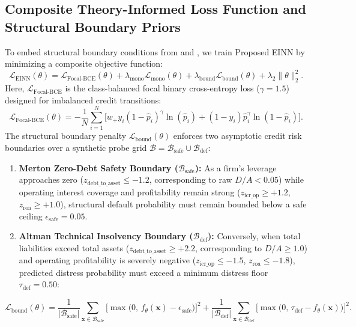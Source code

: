 \documentclass[11pt,a4paper]{article}
\begin{document}
\subsection{Composite Theory-Informed Loss Function and Structural Boundary Priors}
To embed structural boundary conditions from \citet{merton1974pricing} and \citet{altman1995emerging}, we train Proposed EINN by minimizing a composite objective function:
\begin{equation}
    \mathcal{L}_{\text{EINN}}(\theta) = \mathcal{L}_{\text{Focal-BCE}}(\theta) + \lambda_{\text{mono}} \mathcal{L}_{\text{mono}}(\theta) + \lambda_{\text{bound}} \mathcal{L}_{\text{bound}}(\theta) + \lambda_2 \|\theta\|_2^2.
    \label{eq:total_loss}
\end{equation}
Here, $\mathcal{L}_{\text{Focal-BCE}}$ is the class-balanced focal binary cross-entropy loss ($\gamma = 1.5$) designed for imbalanced credit transitions:
\begin{equation}
    \mathcal{L}_{\text{Focal-BCE}}(\theta) = -\frac{1}{N}\sum_{i=1}^N \Big[ w_+ y_i (1 - \hat{p}_i)^\gamma \ln(\hat{p}_i) + (1 - y_i)\hat{p}_i^\gamma \ln(1 - \hat{p}_i) \Big].
\end{equation}
The structural boundary penalty $\mathcal{L}_{\text{bound}}(\theta)$ enforces two asymptotic credit risk boundaries over a synthetic probe grid $\mathcal{B} = \mathcal{B}_{\text{safe}} \cup \mathcal{B}_{\text{def}}$:
\begin{enumerate}
    \item \textbf{Merton Zero-Debt Safety Boundary ($\mathcal{B}_{\text{safe}}$):} As a firm's leverage approaches zero ($z_{\text{debt\_to\_asset}} \le -1.2$, corresponding to raw $D/A < 0.05$) while operating interest coverage and profitability remain strong ($z_{\text{icr\_op}} \ge +1.2$, $z_{\text{roa}} \ge +1.0$), structural default probability must remain bounded below a safe ceiling $\epsilon_{\text{safe}} = 0.05$.
    \item \textbf{Altman Technical Insolvency Boundary ($\mathcal{B}_{\text{def}}$):} Conversely, when total liabilities exceed total assets ($z_{\text{debt\_to\_asset}} \ge +2.2$, corresponding to $D/A \ge 1.0$) and operating profitability is severely negative ($z_{\text{icr\_op}} \le -1.5$, $z_{\text{roa}} \le -1.8$), predicted distress probability must exceed a minimum distress floor $\tau_{\text{def}} = 0.50$:
\end{enumerate}
\begin{equation}
    \mathcal{L}_{\text{bound}}(\theta) = \frac{1}{|\mathcal{B}_{\text{safe}}|} \sum_{\mathbf{x} \in \mathcal{B}_{\text{safe}}} \Big[\max\big(0, \, f_\theta(\mathbf{x}) - \epsilon_{\text{safe}}\big)\Big]^2 + \frac{1}{|\mathcal{B}_{\text{def}}|} \sum_{\mathbf{x} \in \mathcal{B}_{\text{def}}} \Big[\max\big(0, \, \tau_{\text{def}} - f_\theta(\mathbf{x})\big)\Big]^2.
\end{equation}
\end{document}
